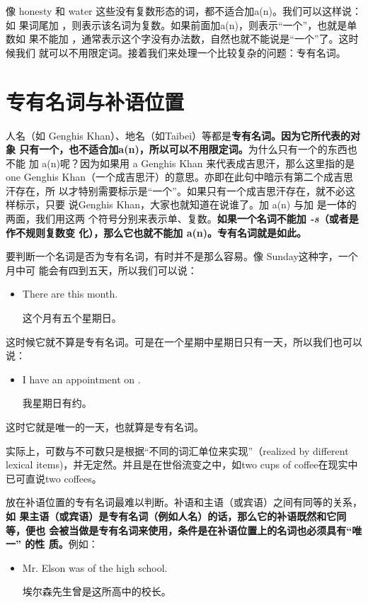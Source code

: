 像 honesty 和 water 这些没有复数形态的词，都不适合加a(n)。我们可以这样说：如
果词尾加 ，则表示该名词为复数。如果前面加a(n)，则表示“一个”，也就是单数如
果不能加 ，通常表示这个字没有办法数，自然也就不能说是“一个”了。这时候我们
就可以不用限定词。接着我们来处理一个比较复杂的问题：专有名词。

\section{专有名词与补语位置}

人名（如 Genghis Khan）、地名（如Taibei）等都是\textbf{专有名词。因为它所代表的对象
  只有一个，也不适合加a(n)，所以可以不用限定词。}为什么只有一个的东西也不能
加 a(n)呢？因为如果用 a Genghis Khan 来代表成吉思汗，那么这里指的是 one
Genghis Khan（一个成吉思汗）的意思。亦即在此句中暗示有第二个成吉思汗存在，所
以才特别需要标示是“一个”。如果只有一个成吉思汗存在，就不必这样标示，只要
说Genghis Khan，大家也就知道在说谁了。加 a(n) 与加 是一体的两面，我们用这两
个符号分别来表示单、复数。\textbf{如果一个名词不能加 \emph{-s}（或者是作不规则复数变
  化），那么它也就不能加 a(n)。专有名词就是如此。}

要判断一个名词是否为专有名词，有时并不是那么容易。像 Sunday这种字，一个月中可
能会有四到五天，所以我们可以说：
\begin{itemize}
\item There are  this month.

  这个月有五个星期日。
\end{itemize}

这时候它就不算是专有名词。可是在一个星期中星期日只有一天，所以我们也可以说：
\begin{itemize}
\item I have an appointment on .

  我星期日有约。
\end{itemize}

这时它就是唯一的一天，也就算是专有名词。

实际上，可数与不可数只是根据“不同的词汇单位来实现”（realized by different
lexical items)，并无定然。并且是在世俗流变之中，如two cups of coffee在现实中
已可直说two coffees。

放在补语位置的专有名词最难以判断。补语和主语（或宾语）之间有同等的关系，\textbf{如
  果主语（或宾语）是专有名词（例如人名）的话，那么它的补语既然和它同等，便也
  会被当做是专有名词来使用，条件是在补语位置上的名词也必须具有“唯一” 的性
  质。}例如：

\begin{itemize}
\item Mr. Elson was  of the high school.

  埃尔森先生曾是这所高中的校长。
\end{itemize}

